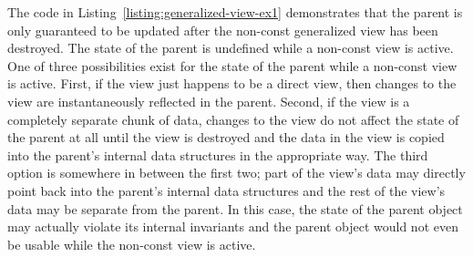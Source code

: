 \documentclass[pdf,ps2pdf,11pt]{SANDreport}
\begin{document}
The code in Listing~\ref{listing:generalized-view-ex1} demonstrates
that the parent is only guaranteed to be updated after the non-const
generalized view has been destroyed.  The state of the parent is
undefined while a non-const view is active.  One of three
possibilities exist for the state of the parent while a non-const view
is active.  First, if the view just happens to be a direct view, then
changes to the view are instantaneously reflected in the parent.
Second, if the view is a completely separate chunk of data, changes to
the view do not affect the state of the parent at all until the view
is destroyed and the data in the view is copied into the parent's
internal data structures in the appropriate way.  The third option is
somewhere in between the first two; part of the view's data may
directly point back into the parent's internal data structures and the
rest of the view's data may be separate from the parent.  In this
case, the state of the parent object may actually violate its internal
invariants and the parent object would not even be usable while the
non-const view is active.
\end{document}
